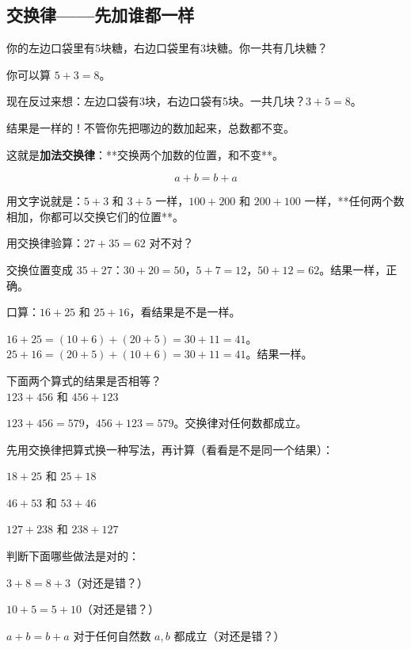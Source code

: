 
\subsection*{交换律——先加谁都一样}

你的左边口袋里有5块糖，右边口袋里有3块糖。你一共有几块糖？

你可以算 $5+3=8$。

现在反过来想：左边口袋有3块，右边口袋有5块。一共几块？$3+5=8$。

结果是一样的！不管你先把哪边的数加起来，总数都不变。

这就是\textbf{加法交换律}：**交换两个加数的位置，和不变**。

\[
a + b = b + a
\]

用文字说就是：$5+3$ 和 $3+5$ 一样，$100+200$ 和 $200+100$ 一样，**任何两个数相加，你都可以交换它们的位置**。

\begin{example}
用交换律验算：$27+35=62$ 对不对？
\end{example}
\begin{solution}
交换位置变成 $35+27$：$30+20=50$，$5+7=12$，$50+12=62$。结果一样，正确。
\end{solution}

\begin{example}
口算：$16+25$ 和 $25+16$，看结果是不是一样。
\end{example}
\begin{solution}
$16+25 = (10+6)+(20+5) = 30+11 = 41$。\\
$25+16 = (20+5)+(10+6) = 30+11 = 41$。结果一样。
\end{solution}

\begin{example}
下面两个算式的结果是否相等？\\
$123+456$ 和 $456+123$
\end{example}
\begin{solution}
$123+456 = 579$，$456+123 = 579$。交换律对任何数都成立。
\end{solution}

\begin{exercise}
\item 先用交换律把算式换一种写法，再计算（看看是不是同一个结果）：
  \begin{subexercise}
    \item $18+25$ 和 $25+18$
    \item $46+53$ 和 $53+46$
    \item $127+238$ 和 $238+127$
  \end{subexercise}

\item 判断下面哪些做法是对的：
  \begin{subexercise}
    \item $3+8 = 8+3$（对还是错？）
    \item $10+5 = 5+10$（对还是错？）
    \item $a+b = b+a$ 对于任何自然数 $a,b$ 都成立（对还是错？）
  \end{subexercise}
\end{exercise}

